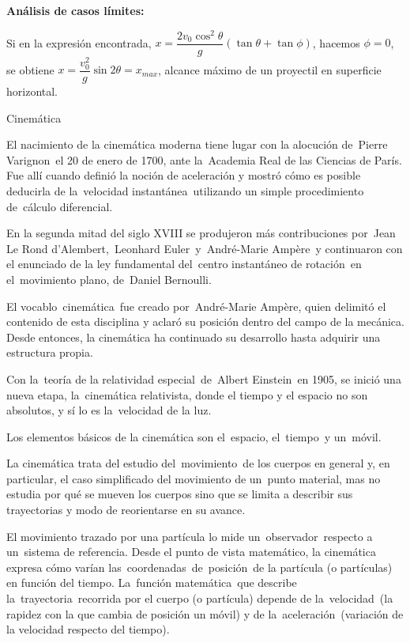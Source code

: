 	
		
\vspace{-3mm}\textbf{Análisis de casos límites:} 

Si en la expresión encontrada, $x=\dfrac{2v_0 \cos^2 \theta}{g}(\tan \theta+\tan \phi)$, hacemos $\phi=0$, se obtiene $x=\dfrac{v_0^2}{g} \sin 2\theta=x_{max}$, alcance máximo de un proyectil en superficie horizontal.



\begin{myblock}{Cinemática}
	
\begin{small}
El nacimiento de la cinemática moderna tiene lugar con la alocución de Pierre Varignon el 20 de enero de 1700, ante la Academia Real de las Ciencias de París. Fue allí cuando definió la noción de aceleración y mostró cómo es posible deducirla de la velocidad instantánea utilizando un simple procedimiento de cálculo diferencial.

\vspace{2mm} En la segunda mitad del siglo XVIII se produjeron más contribuciones por Jean Le Rond d'Alembert, Leonhard Euler y André-Marie Ampère y continuaron con el enunciado de la ley fundamental del centro instantáneo de rotación en el movimiento plano, de Daniel Bernoulli.

\vspace{2mm} El vocablo cinemática fue creado por André-Marie Ampère, quien delimitó el contenido de esta disciplina y aclaró su posición dentro del campo de la mecánica. Desde entonces, la cinemática ha continuado su desarrollo hasta adquirir una estructura propia.

\vspace{2mm} Con la teoría de la relatividad especial de Albert Einstein en 1905, se inició una nueva etapa, la cinemática relativista, donde el tiempo y el espacio no son absolutos, y sí lo es la velocidad de la luz.

\vspace{2mm} Los elementos básicos de la cinemática son el espacio, el tiempo y un móvil.

\vspace{2mm} La cinemática trata del estudio del movimiento de los cuerpos en general y, en particular, el caso simplificado del movimiento de un punto material, mas no estudia por qué se mueven los cuerpos sino que se limita a describir sus trayectorias y modo de reorientarse en su avance.

\vspace{2mm} El movimiento trazado por una partícula lo mide un observador respecto a un sistema de referencia. Desde el punto de vista matemático, la cinemática expresa cómo varían las coordenadas de posición de la partícula (o partículas) en función del tiempo. La función matemática que describe la trayectoria recorrida por el cuerpo (o partícula) depende de la velocidad (la rapidez con la que cambia de posición un móvil) y de la aceleración (variación de la velocidad respecto del tiempo).


\end{small}
\end{myblock}
